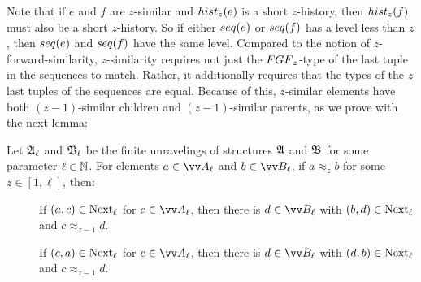 Note that if $e$ and $f$ are $z$-similar and $\hist{z}{e}$ is a short $z$-history, then $\hist{z}{f}$ must also be a short $z$-history.
So if either $\seq{e}$ or $\seq{f}$ has a level less than $z$, then $\seq{e}$ and $\seq{f}$ have the same level.
Compared to the notion of $z$-forward-similarity, $z$-similarity requires not just the $\FGF_{z}$-type of the last tuple in the sequences to match.
Rather, it additionally requires that the types of the $z$ last tuples of the sequences are equal.
Because of this, $z$-similar elements have both $(z-1)$-similar children and $(z-1)$-similar parents, as we prove with the next lemma:
\begin{lemma}\label{lem:approx-next}
  Let ${\mathfrak{A}}_{\ell}$ and ${\mathfrak{B}}_{\ell}$ be the finite unravelings of structures ${\mathfrak{A}}$ and ${\mathfrak{B}}$ for some parameter $\ell \in {\mathbb{N}}$.
  For elements $a \in \unraveldom{A}_{\ell}$ and $b \in \unraveldom{B}_{\ell}$, if $a \approx_{z} b$ for some $z \in [1,\ell]$, then:
  \begin{description}
    \item[] If $(a, c) \in \mathrm{Next}_{\ell}$ for $c \in \unraveldom{A}_{\ell}$, then there is $d \in \unraveldom{B}_{\ell}$ with $(b, d) \in \mathrm{Next}_{\ell}$ and $c \approx_{z-1} d$.
    \item[] If $(c, a) \in \mathrm{Next}_{\ell}$ for $c \in \unraveldom{A}_{\ell}$, then there is $d \in \unraveldom{B}_{\ell}$ with $(d, b) \in \mathrm{Next}_{\ell}$ and $c \approx_{z-1} d$.
  \end{description}
\end{lemma}
